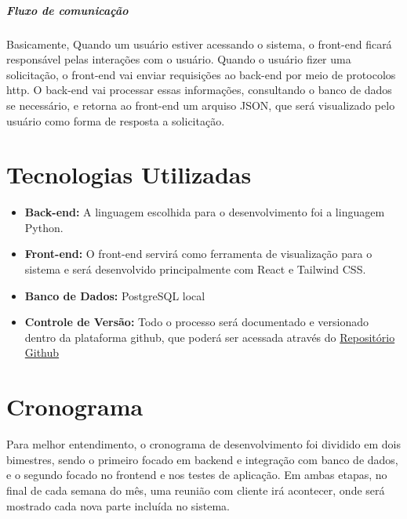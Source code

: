\documentclass[12pt,a4paper]{report}
\begin{document}
\paragraph{Fluxo de comunicação}
Basicamente, Quando um usuário estiver acessando o sistema, o front-end ficará responsável pelas interações com o usuário. Quando o usuário fizer uma solicitação, o front-end vai enviar requisições	ao back-end por meio de protocolos http. O back-end vai processar essas informações, consultando o banco de dados se necessário, e retorna ao front-end um arquiso JSON, que será visualizado pelo usuário como forma de resposta a solicitação.



\chapter{Tecnologias Utilizadas}

\begin{itemize}
	\item \textbf{Back-end:} A linguagem escolhida para o desenvolvimento foi a linguagem Python.
	\item \textbf{Front-end:} O front-end servirá como ferramenta de visualização para o sistema e será desenvolvido principalmente com React e Tailwind CSS.
	\item \textbf{Banco de Dados:} PostgreSQL local
	\item \textbf{Controle de Versão:} Todo o processo será documentado e versionado dentro da plataforma github, que poderá ser acessada através do \href{https://github.com/DaviRodrish/Projeto-PooDev---Agenda-Escolar}{Repositório Github}
\end{itemize}

\chapter{Cronograma}
\label{sec:cronograma}

Para melhor entendimento, o cronograma de desenvolvimento foi dividido em dois bimestres, sendo o primeiro focado em backend e integração com banco de dados, e o segundo focado no frontend e nos testes de aplicação. Em ambas etapas, no final de cada semana do mês, uma reunião com cliente irá acontecer, onde será mostrado cada nova parte incluída no sistema.  
\end{document}
